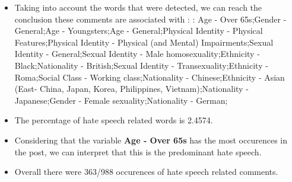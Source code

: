 \documentclass[11pt]{article}
\begin{document}
\begin{itemize}\item Taking into account the words that were detected, we can reach the conclusion these comments are associated with : : Age - Over 65s;Gender - General;Age - Youngsters;Age - General;Physical Identity - Physical Features;Physical Identity - Physical (and Mental) Impairments;Sexual Identity - General;Sexual Identity - Male homosexuality;Ethnicity - Black;Nationality - British;Sexual Identity - Transexuality;Ethnicity - Roma;Social Class - Working class;Nationality - Chinese;Ethnicity - Asian (East- China, Japan, Korea, Philippines, Vietnam);Nationality - Japanese;Gender - Female sexuality;Nationality - German;%

\item The percentage of hate speech related words is 2.4574.

\item Considering that the variable \textbf{Age - Over 65s} has the most occurences in the post, we can interpret that this is the predominant hate speech.

\item Overall there were 363/988 occurences of hate speech related comments.\end{itemize}
\end{document}
